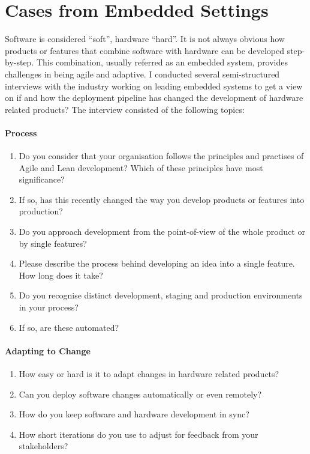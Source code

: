 \documentclass[english]{tktltiki2}
\begin{document}

\section{Cases from Embedded Settings}

Software is considered “soft”, hardware “hard”. It is not always obvious how products or features that combine software with hardware can be developed step-by-step. This combination, usually referred as an embedded system, provides challenges in being agile and adaptive. I conducted several semi-structured interviews with the industry working on leading embedded systems to get a view on if and how the deployment pipeline has changed the development of hardware related products? The interview consisted of the following topics:

\paragraph{Process}

\begin{enumerate}

    \item Do you consider that your organisation follows the principles and practises of Agile and Lean development? Which of these principles have most significance?
    \item If so, has this recently changed the way you develop products or features into production?
    \item Do you approach development from the point-of-view of the whole product or by single features?
    \item Please describe the process behind developing an idea into a single feature. How long does it take?
    \item Do you recognise distinct development, staging and production environments in your process?
    \item If so, are these automated?

\end{enumerate}

\paragraph{Adapting to Change}

\begin{enumerate}[resume]

    \item How easy or hard is it to adapt changes in hardware related products?
    \item Can you deploy software changes automatically or even remotely?
    \item How do you keep software and hardware development in sync?
    \item How short iterations do you use to adjust for feedback from your stakeholders?

\end{enumerate}
\end{document}

